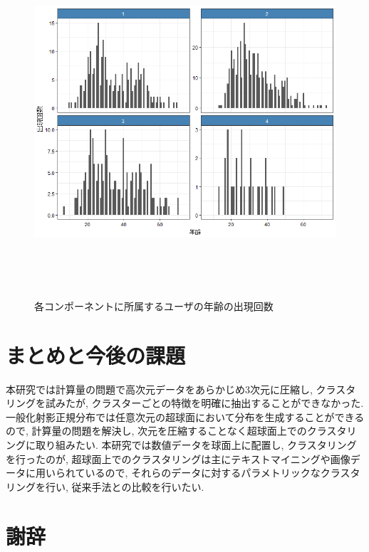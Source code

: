 \documentclass[a4j,12pt]{jarticle}
\begin{document}
\begin{figure}[tbp]
\begin{center}
\includegraphics[clip,height= 130mm]{data/age_count.png}
\end{center}
\caption{各コンポーネントに所属するユーザの年齢の出現回数}
\label{age_count}
\end{figure}

\newpage
\section{まとめと今後の課題}

本研究では計算量の問題で高次元データをあらかじめ$3$次元に圧縮し, クラスタリングを試みたが, クラスターごとの特徴を明確に抽出することができなかった. 一般化射影正規分布では任意次元の超球面において分布を生成することができるので, 計算量の問題を解決し, 次元を圧縮することなく超球面上でのクラスタリングに取り組みたい. 本研究では数値データを球面上に配置し, クラスタリングを行ったのが, 超球面上でのクラスタリングは主にテキストマイニングや画像データに用いられているので, それらのデータに対するパラメトリックなクラスタリングを行い, 従来手法との比較を行いたい. 

\section{謝辞}
\end{document}

